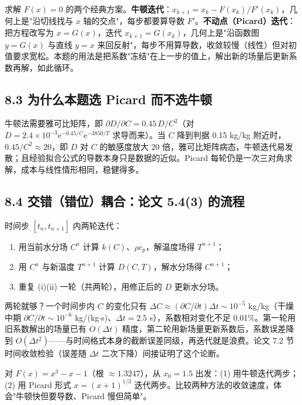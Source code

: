 \documentclass[12pt,a4paper]{ctexart}
\newcommand{\handon}[1]{\par\smallskip\noindent{\heiti 【手推练习】}#1\par\smallskip}
\newcommand{\why}[1]{\par\smallskip\noindent{\heiti 【为什么要这样做】}#1\par\smallskip}
\begin{document}
求解 $F(x)=0$ 的两个经典方案。\textbf{牛顿迭代}：$x_{k+1}=x_k-F(x_k)/F'(x_k)$，几何上是"沿切线找与 $x$ 轴的交点"，每步都要算导数 $F'$。\textbf{不动点（Picard）迭代}：把方程改写为 $x=G(x)$，迭代 $x_{k+1}=G(x_k)$，几何上是"沿函数图 $y=G(x)$ 与直线 $y=x$ 来回反射"，每步不用算导数，收敛较慢（线性）但对初值要求宽松。本题的用法是把系数"冻结"在上一步的值上，解出新的场量后更新系数再解，如此循环。

\subsection{8.3 为什么本题选 Picard 而不选牛顿}

牛顿法需要雅可比矩阵，即 $\partial D/\partial C=0.45\,D/C^2$（对 $D=2.4\times10^{-3}\mathrm{e}^{-0.45/C}\mathrm{e}^{-3850/T}$ 求导而来）。当 $C$ 降到判据 0.15 kg/kg 附近时，$0.45/C^2\approx20$，即 $D$ 对 $C$ 的敏感度放大 20 倍，雅可比矩阵病态，牛顿迭代易发散；且经验拟合公式的导数本身只是数据的近似。Picard 每轮仍是一次三对角求解，成本与线性情形相同，稳健得多。

\subsection{8.4 交错（错位）耦合：论文 5.4(3) 的流程}

时间步 $[t_n,t_{n+1}]$ 内两轮迭代：
\begin{enumerate}[label=(\roman*),leftmargin=3em]
\item 用当前水分场 $C^n$ 计算 $k(C)$、$\rho c_p$，解温度场得 $T^{n+1}$；
\item 用 $C^n$ 与新温度 $T^{n+1}$ 计算 $D(C,T)$，解水分场得 $C^{n+1}$；
\item 重复 (i)(ii) 一轮（共两轮），用修正后的 $D$ 更新水分场。
\end{enumerate}

\why{两轮就够？一个时间步内 $C$ 的变化只有 $\Delta C\approx(\partial C/\partial t)\Delta t\sim10^{-5}$ kg/kg（干燥中期 $\partial C/\partial t\sim10^{-6}$ kg/(kg$\cdot$s)、$\Delta t=2.5$ s），系数相对变化不足 0.01\%。第一轮用旧系数解出的场量已有 $O(\Delta t)$ 精度，第二轮用新场量更新系数后，系数误差降到 $O(\Delta t^2)$——与时间格式本身的截断误差同级，再迭代就是浪费。论文 7.2 节时间收敛检验（误差随 $\Delta t$ 二次下降）间接证明了这个论断。}

\handon{对 $F(x)=x^3-x-1$（根 $\approx1.3247$），从 $x_0=1.5$ 出发：(1) 用牛顿迭代两步；(2) 用 Picard 形式 $x=(x+1)^{1/3}$ 迭代两步。比较两种方法的收敛速度，体会"牛顿快但要导数、Picard 慢但简单"。}
\end{document}
